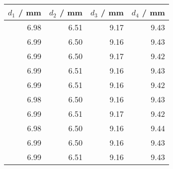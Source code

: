 \begin{tabular}{rrrr}\\
 $d_1$ / mm & $d_2$ / mm & $d_3$ / mm & $d_4$ / mm  \\
 \hline
6.98 & 6.51 & 9.17 & 9.43\\
6.99 & 6.50 & 9.16 & 9.43\\
6.99 & 6.50 & 9.17 & 9.42\\
6.99 & 6.51 & 9.16 & 9.43\\
6.99 & 6.51 & 9.16 & 9.42\\
6.98 & 6.50 & 9.16 & 9.43\\
6.99 & 6.51 & 9.17 & 9.42\\
6.98 & 6.50 & 9.16 & 9.44\\
6.99 & 6.50 & 9.16 & 9.43\\
6.99 & 6.51 & 9.16 & 9.43
\end{tabular}